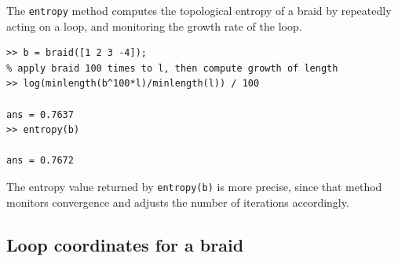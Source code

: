 \documentclass[12pt]{article}
\begin{document}
The \lstinline{entropy} method computes the topological entropy of a
braid by repeatedly acting on a loop, and monitoring the growth rate
of the loop.
\begin{lstlisting}[frame=single,framerule=0pt]
>> b = braid([1 2 3 -4]);
% apply braid 100 times to l, then compute growth of length
>> log(minlength(b^100*l)/minlength(l)) / 100

ans = 0.7637
>> entropy(b)

ans = 0.7672
\end{lstlisting}
The entropy value returned by \lstinline{entropy(b)} is more precise,
since that method monitors convergence and adjusts the number of
iterations accordingly.


\subsection{Loop coordinates for a braid}
\label{sec:loopcoords}
\end{document}
